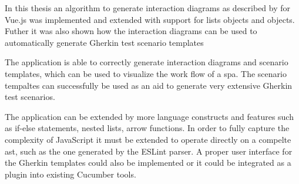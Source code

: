 In this thesis an algorithm to generate interaction diagrams as described by \textcite{zhang2019scenario} for Vue.js was implemented and extended with support for lists objects and objects. Futher it was also shown how the interaction diagrams can be used to automatically generate Gherkin test scenario templates

The application is able to correctly generate interaction diagrams and scenario templates, which can be used to visualize the work flow of a \gls{spa}. The scenario tempaltes can successfully be used as an aid to generate very extensive Gherkin test scenarios. 


The application can be extended by more language constructs and features such as if-else statements, nested lists, arrow functions. In order to fully capture the complexity of JavaScript it must be extended to operate directly on a compelte \gls{ast}, such as the one generated by the ESLint parser.
A proper user interface for the Gherkin templates could also be implemented or it could be integrated as a plugin into existing Cucumber tools.